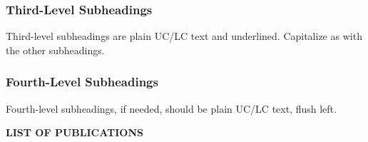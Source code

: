 \documentclass[a4paper, 12pt, twoside]{report}
\theoremstyle{definition}
\begin{document}
\begin{appendix}
\subsubsection{Third-Level Subheadings}
Third-level subheadings are plain UC/LC text and underlined. Capitalize as with the other subheadings. 
\subsubsection{Fourth-Level Subheadings}

Fourth-level subheadings, if needed, should be plain UC/LC text, flush left. 
\end{appendix} 
\newpage
{}
\begin{center}
\textbf {LIST OF PUBLICATIONS}
\end{center}
\end{document}
